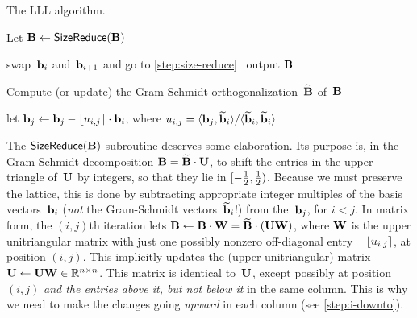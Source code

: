 \documentclass[11pt]{article}
\begin{document}
\begin{algorithm}
  \caption{The LLL algorithm.}
  \label{alg:lll}

  \begin{algorithmic}[1]

    \State Let
    $\mathbf{B} \gets \mathsf{SizeReduce}(\mathbf{B})$\label{step:size-reduce}

     \State swap~$\mathbf{b}_{i}$ and~$\mathbf{b}_{i+1}$ and go to
    \cref{step:size-reduce} \Else\ output $\mathbf{B}$\label{step:swap}
    \EndIf

    \EndFunction


    \State Compute (or update) the Gram-Schmidt
    orthogonalization~$\widetilde{\mathbf{B}}$ of~$\mathbf{B}$\label{step:compute-gs}

    \label{step:i-downto}

    \State let
    $\mathbf{b}_{j} \gets \mathbf{b}_{j} - \lfloor u_{i,j}\rceil \cdot \mathbf{b}_{i}$,
    where
    $u_{i,j} = \langle\mathbf{b}_{j},
      \widetilde{\mathbf{b}}_{i}\rangle/\langle\widetilde{\mathbf{b}}_{i}, \widetilde{\mathbf{b}}_{i}\rangle$

    \EndFor \EndFor \EndFunction
  \end{algorithmic}
\end{algorithm}

The $\mathsf{SizeReduce}(\mathbf{B})$ subroutine deserves some elaboration.
Its purpose is, in the Gram-Schmidt decomposition
$\mathbf{B} = \widetilde{\mathbf{B}} \cdot \mathbf{U}$, to shift the entries in the upper
triangle of~$\mathbf{U}$ by integers, so that they lie in $[-\tfrac12,\tfrac12)$.
Because we must preserve the lattice, this is done by subtracting
appropriate integer multiples of the basis vectors~$\mathbf{b}_{i}$
(\emph{not} the Gram-Schmidt vectors~$\widetilde{\mathbf{b}}_{i}$!) from
the~$\mathbf{b}_{j}$, for $i < j$. In matrix form, the $(i,j)$th iteration
lets $\mathbf{B} \gets \mathbf{B} \cdot \mathbf{W} = \widetilde{\mathbf{B}} \cdot (\mathbf{U} \mathbf{W})$,
where $\mathbf{W}$ is the upper unitriangular matrix with just one possibly
nonzero off-diagonal entry $-\lfloor u_{i,j}\rceil$, at position $(i,j)$.
This implicitly updates the (upper unitriangular) matrix
$\mathbf{U} \gets \mathbf{U} \mathbf{W} \in \mathbb{R}^{n \times n}$. This matrix is
identical to~$\mathbf{U}$, except possibly at position $(i,j)$ \emph{and
  the entries above it, but not below it} in the same column. This is
why we need to make the changes going \emph{upward} in each column
(see \cref{step:i-downto}).
\end{document}
